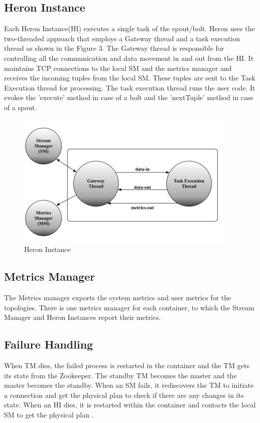 \documentclass[9pt,twocolumn,twoside]{../../styles/osajnl}
\begin{document}
\subsection{Heron Instance}
Each Heron Instance(HI) executes a single task of the spout/bolt. Heron uses the two-threaded approach that employs a Gateway thread and a task execution thread as shown in the Figure 3. The Gateway thread is responsible for controlling all the communication and data movement in and out from the HI. It maintains TCP connections to the local SM and the metrics manager and receives the incoming tuples from the local SM. These tuples are sent to the Task Execution thread for processing. The task execution thread runs the user code. It evokes the 'execute' method in case of a bolt and the 'nextTuple' method in case of a spout.
\begin{figure}[htbp]
\begin{center}
\centering
\includegraphics[width=\linewidth]{images/img3}
\caption{Heron Instance \cite{TwitterHeron4}}
\label{fig:false-color}
\end{center}
\end{figure}
\subsection{Metrics Manager}
The Metrics manager exports the system metrics and user metrics for the topologies. There is one metrics
manager for each container, to which the Stream Manager and Heron Instances report their metrics.
\subsection{Failure Handling}
When TM dies, the failed process is restarted in the container and the TM gets its state from the Zookeeper. The standby TM becomes the master and the master becomes the standby. When an SM fails, it rediscovers the TM to initiate a connection and get the physical plan to check if there are any changes in its state. When an HI dies, it is restarted within the container and contacts the local SM to get the physical plan \cite{TwitterHeron4}.
\end{document}
